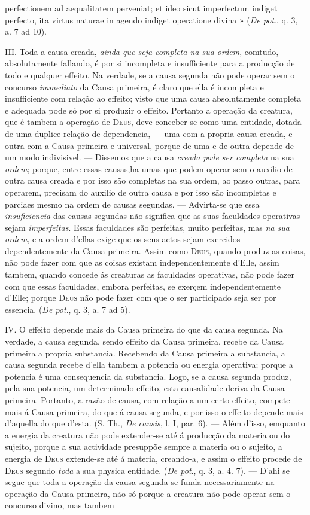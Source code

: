 perfectionem ad aequalitatem perveniat; et ideo sicut imperfectum indiget perfecto, ita virtus naturae in agendo indiget operatione divina » (\emph{De pot}., q. 3, a. 7 ad 10).\par III. Toda a causa creada, \emph{ainda que seja completa na sua ordem}, comtudo, absolutamente fallando, é por si incompleta e insufficiente para a producção de todo e qualquer effeito. Na verdade, se a causa segunda não pode operar sem o concurso \emph{immediato} da Causa primeira, é claro que ella é incompleta e insufficiente com relação ao effeito; visto que uma causa absolutamente completa e adequada pode só por si produzir o effeito. Portanto a operação da creatura, que é tambem a operação de \textsc{Deus}, deve conceber-se como uma entidade, dotada de uma duplice relação de dependencia, --- uma com a propria causa creada, e outra com a Causa primeira e universal, porque de uma e de outra depende de um modo indivisivel. --- Dissemos que a causa \emph{creada pode ser completa} na sua \emph{ordem}; porque, entre essas causas,ha umas que podem operar sem o auxilio de outra causa creada e por isso são completas na sua ordem, ao passo outras, para operarem, precisam do auxilio de outra causa e por isso são incompletas e parciaes mesmo na ordem de causas segundas. --- Advirta-se que essa \emph{insuficiencia} das causas segundas não significa que as suas faculdades operativas sejam \emph{imperfeitas}. Essas faculdades são perfeitas, muito perfeitas, mas \emph{na sua ordem}, e a ordem d'ellas exige que os seus actos sejam exercidos dependentemente da Causa primeira. Assim como \textsc{Deus}, quando produz as coisas, não pode fazer com que as coisas existam independentemente d'Elle, assim tambem, quando concede ás creaturas as faculdades operativas, não pode fazer com que essas faculdades, embora perfeitas, se exerçem independentemente d'Elle; porque \textsc{Deus} não pode fazer com que o ser participado seja ser por essencia. (\emph{De pot}., q. 3, a. 7 ad 5).\par IV. O effeito depende mais da Causa primeira do que da causa segunda. Na verdade, a causa segunda, sendo effeito da Causa primeira, recebe da Causa primeira a propria substancia. Recebendo da Causa primeira a substancia, a causa segunda recebe d'ella tambem a potencia ou energia operativa; porque a potencia é uma consequencia da substancia. Logo, se a causa segunda produz, pela sua potencia, um determinado effeito, esta causalidade deriva da Causa primeira. Portanto, a razão de causa, com relação a um certo effeito, compete mais á Causa primeira, do que á causa segunda, e por isso o effeito depende mais d'aquella do que d'esta. (S. Th., \emph{De causis}, l. I, par. 6). --- Além d'isso, emquanto a energia da creatura não pode extender-se até á producção da materia ou do sujeito, porque a sua actividade presuppõe sempre a materia ou o sujeito, a energia de \textsc{Deus} extende-se até á materia, creando-a, e assim o effeito procede de \textsc{Deus} segundo \emph{toda} a sua physica entidade. (\emph{De pot}., q. 3, a. 4. 7). --- D'ahi se segue que toda a operação da causa segunda se funda necessariamente na operação da Causa primeira, não só porque a creatura não pode operar sem o concurso divino, mas tambem 